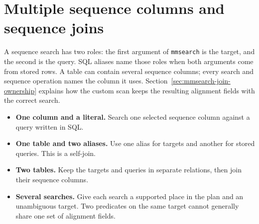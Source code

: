 \section{Multiple sequence columns and sequence joins}
\label{sec:appendix-joins}

A sequence search has two roles: the first argument of \texttt{mmsearch} is
the target, and the second is the query. SQL aliases name those roles when
both arguments come from stored rows. A table can contain several sequence
columns; every search and sequence operation names the column it uses.
Section~\ref{sec:mmsearch-join-ownership} explains how the custom scan keeps
the resulting alignment fields with the correct search.

\begin{itemize}
  \item \textbf{One column and a literal.} Search one selected sequence
    column against a query written in SQL.
  \item \textbf{One table and two aliases.} Use one alias for targets and
    another for stored queries. This is a self-join.
  \item \textbf{Two tables.} Keep the targets and queries in separate
    relations, then join their sequence columns.
  \item \textbf{Several searches.} Give each search a supported place in
    the plan and an unambiguous target. Two predicates on the same target
    cannot generally share one set of alignment fields.
\end{itemize}

